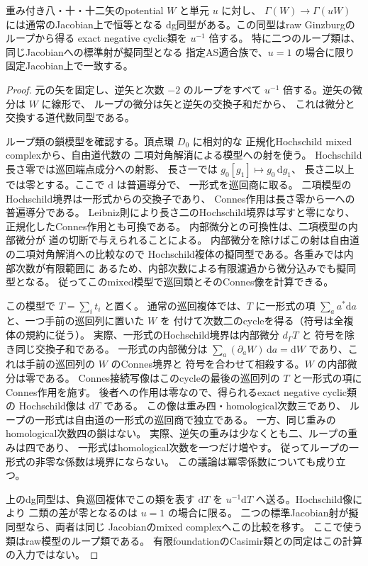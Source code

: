 \begin{proposition}
\label{prop:qa-raw-scalar-loop-class}
重み付き八・十・十二矢のpotential $W$ と単元 $u$ に対し、
$\Gamma(W)\to\Gamma(uW)$ には通常のJacobian上で恒等となる
dg同型がある。この同型はraw Ginzburgのループから得る
exact negative cyclic類を $u^{-1}$ 倍する。
特に二つのループ類は、同じJacobianへの標準射が擬同型となる
指定AS適合族で、$u=1$ の場合に限り固定Jacobian上で一致する。
\end{proposition}
\begin{proof}
元の矢を固定し、逆矢と次数 $-2$ のループをすべて
$u^{-1}$ 倍する。逆矢の微分は $W$ に線形で、
ループの微分は矢と逆矢の交換子和だから、
これは微分と交換する道代数同型である。

ループ類の鎖模型を確認する。頂点環 $D_0$ に相対的な
正規化Hochschild mixed complexから、自由道代数の
二項対角解消による模型への射を使う。
Hochschild長さ零では巡回端点成分への射影、
長さ一では $g_0[g_1]\mapsto g_0\,\mathrm d g_1$、
長さ二以上では零とする。ここで $\mathrm d$ は普遍導分で、
一形式を巡回商に取る。
二項模型のHochschild境界は一形式からの交換子であり、
Connes作用は長さ零から一への普遍導分である。
Leibniz則により長さ二のHochschild境界は写すと零になり、
正規化したConnes作用とも可換である。
内部微分との可換性は、二項模型の内部微分が
道の切断で与えられることによる。
内部微分を除けばこの射は自由道の二項対角解消への比較なので
Hochschild複体の擬同型である。各重みでは内部次数が有限範囲に
あるため、内部次数による有限濾過から微分込みでも擬同型となる。
従ってこのmixed模型で巡回類とそのConnes像を計算できる。

この模型で $T=\sum_i t_i$ と置く。
通常の巡回複体では、$T$ に一形式の項
$\sum_a a^*\mathrm d a$ と、一つ手前の巡回列に置いた $W$ を
付けて次数二のcycleを得る（符号は全複体の規約に従う）。
実際、一形式のHochschild境界は内部微分 $d_\Gamma T$ と
符号を除き同じ交換子和である。
一形式の内部微分は $\sum_a (\partial_a W)\,\mathrm d a
=\mathrm d W$ であり、これは手前の巡回列の $W$ のConnes境界と
符号を合わせて相殺する。$W$ の内部微分は零である。
Connes接続写像はこのcycleの最後の巡回列の
$T$ と一形式の項にConnes作用を施す。
後者への作用は零なので、得られるexact negative cyclic類の
Hochschild像は $\mathrm d T$ である。
この像は重み四・homological次数三であり、
ループの一形式は自由道の一形式の巡回商で独立である。
一方、同じ重みのhomological次数四の鎖はない。
実際、逆矢の重みは少なくとも二、ループの重みは四であり、
一形式はhomological次数を一つだけ増やす。
従ってループの一形式の非零な係数は境界にならない。
この議論は冪零係数についても成り立つ。

上のdg同型は、負巡回複体でこの類を表す $\mathrm d T$ を
$u^{-1}\mathrm d T$ へ送る。Hochschild像により
二類の差が零となるのは $u=1$ の場合に限る。
二つの標準Jacobian射が擬同型なら、両者は同じ
Jacobianのmixed complexへこの比較を移す。
ここで使う類はraw模型のループ類である。
有限foundationのCasimir類との同定はこの計算の入力ではない。
\end{proof}

